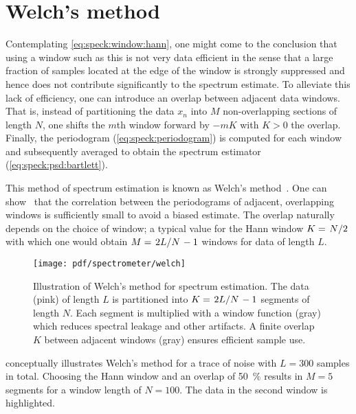 \section{Welch's method}\label{sec:speck:theory:welch}
Contemplating \cref{eq:speck:window:hann}, one might come to the conclusion that using a window such as this is not very data efficient in the sense that a large fraction of samples located at the edge of the window is strongly suppressed and hence does not contribute significantly to the spectrum estimate.
To alleviate this lack of efficiency, one can introduce an overlap between adjacent data windows.
That is, instead of partitioning the data $x_n$ into $M$ non-overlapping sections of length $N$, one shifts the $m$th window forward by $-mK$ with $K>0$ the overlap.
Finally, the periodogram (\cref{eq:speck:periodogram}) is computed for each window and subsequently averaged to obtain the spectrum estimator (\cref{eq:speck:psd:bartlett}).

This method of spectrum estimation is known as Welch's method~\cite{Welch1967}.
One can show~\cite{Welch1967} that the correlation between the periodograms of adjacent, overlapping windows is sufficiently small to avoid a biased estimate.
The overlap naturally depends on the choice of window; a typical value for the Hann window $K = \flatfrac{N}{2}$ with which one would obtain $M = \flatfrac{2L}{N} - 1$ windows for data of length $L$.
\begin{figure}[tphb]
    \centering
    \texttt{[image: pdf/spectrometer/welch]}
    \caption{
        Illustration of Welch's method for spectrum estimation.
        The data (pink) of length $L$ is partitioned into $K = \flatfrac{2L}{N} - 1$ segments of length $N$.
        Each segment is multiplied with a window function (gray) which reduces spectral leakage and other artifacts.
        A finite overlap $K$ between adjacent windows (gray) ensures efficient sample use.
    }
    \label{fig:welch}
\end{figure}

 conceptually illustrates Welch's method for a trace of \oneoverf noise with $L = 300$ samples in total.
Choosing the Hann window and an overlap of \qty{50}{\percent} results in $M=5$ segments for a window length of $N=100$.
The data in the second window is highlighted.

